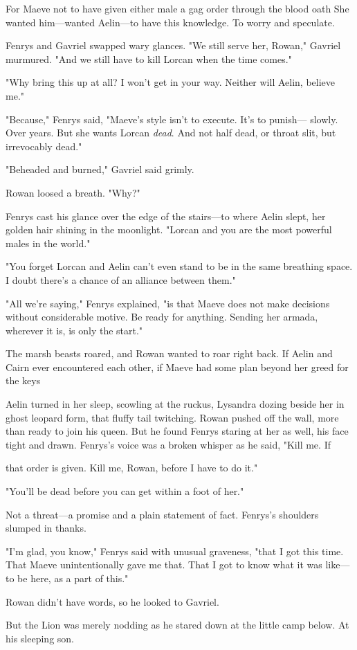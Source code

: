 For Maeve not to have given either male a gag order through the blood oath  She wanted him---wanted Aelin---to have this knowledge. To worry and speculate.

Fenrys and Gavriel swapped wary glances. "We still serve her, Rowan," Gavriel murmured. "And we still have to kill Lorcan when the time comes."

"Why bring this up at all? I won't get in your way. Neither will Aelin, believe me."

"Because," Fenrys said, "Maeve's style isn't to execute. It's to punish--- slowly. Over years. But she wants Lorcan \emph{dead}. And not half dead, or throat slit, but irrevocably dead."

"Beheaded and burned," Gavriel said grimly.

Rowan loosed a breath. "Why?"

Fenrys cast his glance over the edge of the stairs---to where Aelin slept, her golden hair shining in the moonlight. "Lorcan and you are the most powerful males in the world."

"You forget Lorcan and Aelin can't even stand to be in the same breathing space. I doubt there's a chance of an alliance between them."

"All we're saying," Fenrys explained, "is that Maeve does not make decisions without considerable motive. Be ready for anything. Sending her armada, wherever it is, is only the start."

The marsh beasts roared, and Rowan wanted to roar right back. If Aelin and Cairn ever encountered each other, if Maeve had some plan beyond her greed for the keys 

Aelin turned in her sleep, scowling at the ruckus, Lysandra dozing beside her in ghost leopard form, that fluffy tail twitching. Rowan pushed off the wall, more than ready to join his queen. But he found Fenrys staring at her as well, his face tight and drawn. Fenrys's voice was a broken whisper as he said, "Kill me. If

that order is given. Kill me, Rowan, before I have to do it."

"You'll be dead before you can get within a foot of her."

Not a threat---a promise and a plain statement of fact. Fenrys's shoulders slumped in thanks.

"I'm glad, you know," Fenrys said with unusual graveness, "that I got this time. That Maeve unintentionally gave me that. That I got to know what it was like---to be here, as a part of this."

Rowan didn't have words, so he looked to Gavriel.

But the Lion was merely nodding as he stared down at the little camp below. At his sleeping son.
